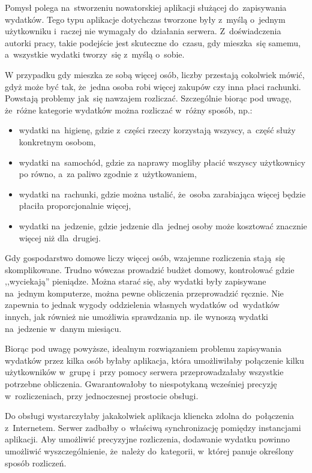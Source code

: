 \documentclass[12pt,a4paper,twoside,titlepage,openright]{book}
\begin{document}
Pomysł polega na~stworzeniu nowatorskiej aplikacji służącej do~zapisywania wydatków. Tego typu aplikacje dotychczas tworzone były z~myślą o~jednym użytkowniku i~raczej nie wymagały do~działania serwera. Z~doświadczenia autorki pracy, takie podejście jest skuteczne do~czasu, gdy mieszka~się samemu, a~wszystkie wydatki tworzy~się z~myślą o~sobie. 

W przypadku gdy mieszka ze sobą więcej osób, liczby przestają cokolwiek mówić, gdyż może być tak, że~jedna osoba robi więcej zakupów czy inna płaci rachunki. Powstają problemy jak~się nawzajem rozliczać. Szczególnie biorąc pod uwagę, że~różne kategorie wydatków można rozliczać w~różny sposób, np.:
\begin{itemize}
\item wydatki na~higienę, gdzie z~części rzeczy korzystają wszyscy, a~część służy konkretnym osobom,
\item wydatki na~samochód, gdzie za naprawy mogliby płacić wszyscy użytkownicy po równo, a~za paliwo zgodnie z~użytkowaniem,
\item wydatki na~rachunki, gdzie można ustalić, że~osoba zarabiająca więcej będzie płaciła proporcjonalnie więcej,
\item wydatki na~jedzenie, gdzie jedzenie dla~jednej osoby może kosztować znacznie więcej niż dla~drugiej.
\end{itemize}
Gdy gospodarstwo domowe liczy więcej osób, wzajemne rozliczenia stają~się skomplikowane. Trudno wówczas prowadzić budżet domowy, kontrolować gdzie ,,wyciekają'' pieniądze. Można starać się, aby wydatki były zapisywane na~jednym komputerze, można pewne obliczenia przeprowadzić ręcznie. Nie zapewnia to jednak wygody oddzielenia własnych wydatków od~wydatków innych, jak również nie umożliwia sprawdzania np. ile wynoszą wydatki na~jedzenie w~danym miesiącu.

Biorąc pod uwagę powyższe, idealnym rozwiązaniem problemu zapisywania wydatków przez kilka osób byłaby aplikacja, która umożliwiłaby połączenie kilku użytkowników w~grupę i~przy pomocy serwera przeprowadzałaby wszystkie potrzebne obliczenia. Gwarantowałoby to niespotykaną wcześniej precyzję w~rozliczeniach, przy jednoczesnej prostocie obsługi. 

Do obsługi wystarczyłaby jakakolwiek aplikacja kliencka zdolna do~połączenia z~Internetem. Serwer zadbałby o~właściwą synchronizację pomiędzy instancjami aplikacji. Aby umożliwić precyzyjne rozliczenia, dodawanie wydatku powinno umożliwić wyszczególnienie, że~należy do~kategorii, w~której panuje określony sposób rozliczeń. 
\end{document}
